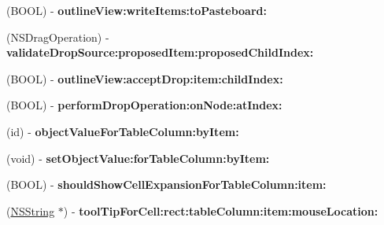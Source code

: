 \begin{DoxyCompactItemize}
\item 
\hypertarget{interface_tree_controller_data_source_a25632da76e5a51daa2063ad5f0d64ca8}{
(BOOL) -\/ {\bfseries outlineView:writeItems:toPasteboard:}}
\label{interface_tree_controller_data_source_a25632da76e5a51daa2063ad5f0d64ca8}

\item 
\hypertarget{interface_tree_controller_data_source_a8adf4c5d12a34cb0b5c02a8c443414f1}{
(NSDragOperation) -\/ {\bfseries validateDropSource:proposedItem:proposedChildIndex:}}
\label{interface_tree_controller_data_source_a8adf4c5d12a34cb0b5c02a8c443414f1}

\item 
\hypertarget{interface_tree_controller_data_source_a457cf93934f1cb2acba9a1f418df3818}{
(BOOL) -\/ {\bfseries outlineView:acceptDrop:item:childIndex:}}
\label{interface_tree_controller_data_source_a457cf93934f1cb2acba9a1f418df3818}

\item 
\hypertarget{interface_tree_controller_data_source_ad371607047e79d9924d6e6b23dc0ad2c}{
(BOOL) -\/ {\bfseries performDropOperation:onNode:atIndex:}}
\label{interface_tree_controller_data_source_ad371607047e79d9924d6e6b23dc0ad2c}

\item 
\hypertarget{interface_tree_controller_data_source_a49b2cb9de93fcc029f27ec33108f90d2}{
(id) -\/ {\bfseries objectValueForTableColumn:byItem:}}
\label{interface_tree_controller_data_source_a49b2cb9de93fcc029f27ec33108f90d2}

\item 
\hypertarget{interface_tree_controller_data_source_a953d5e4cc659e1a020d484e57a0efba6}{
(void) -\/ {\bfseries setObjectValue:forTableColumn:byItem:}}
\label{interface_tree_controller_data_source_a953d5e4cc659e1a020d484e57a0efba6}

\item 
\hypertarget{interface_tree_controller_data_source_a8bba94310c8d8bdf2e3fa0715f772033}{
(BOOL) -\/ {\bfseries shouldShowCellExpansionForTableColumn:item:}}
\label{interface_tree_controller_data_source_a8bba94310c8d8bdf2e3fa0715f772033}

\item 
\hypertarget{interface_tree_controller_data_source_add61903a02a0a32d4e8948861fdee103}{
(\hyperlink{class_n_s_string}{NSString} $\ast$) -\/ {\bfseries toolTipForCell:rect:tableColumn:item:mouseLocation:}}
\label{interface_tree_controller_data_source_add61903a02a0a32d4e8948861fdee103}


\end{DoxyCompactItemize}
